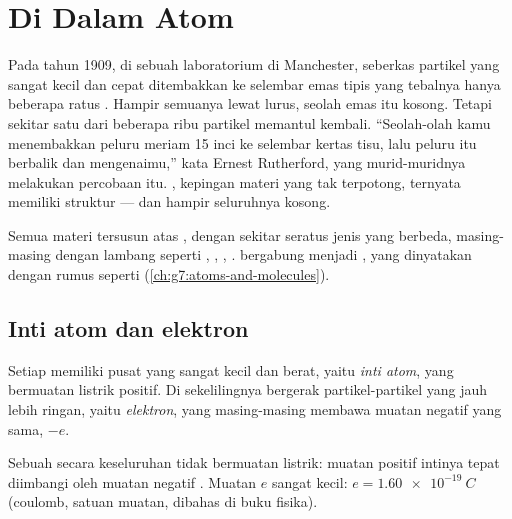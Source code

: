 \chapter{Di Dalam Atom}\label{ch:g9:inside-the-atom}

Pada tahun 1909, di sebuah laboratorium di Manchester, seberkas partikel
yang sangat kecil dan cepat ditembakkan ke selembar emas tipis yang
tebalnya hanya beberapa ratus . Hampir semuanya lewat lurus, seolah
emas itu kosong. Tetapi sekitar satu dari beberapa ribu partikel
memantul kembali. ``Seolah-olah kamu menembakkan peluru meriam 15 inci
ke selembar kertas tisu, lalu peluru itu berbalik dan mengenaimu,''
kata Ernest Rutherford, yang murid-muridnya melakukan percobaan itu.
, kepingan materi yang tak terpotong, ternyata memiliki struktur ---
dan hampir seluruhnya kosong.

\begin{recall}
Semua materi tersusun atas , dengan sekitar seratus jenis yang
berbeda, masing-masing dengan lambang seperti , , ,
.  bergabung menjadi , yang dinyatakan dengan
rumus seperti  (\cref{ch:g7:atoms-and-molecules}).
\end{recall}

\section{Inti atom dan elektron}

\begin{definition}\label{def:g9:inside-the-atom:nucleus}
Setiap  memiliki pusat yang sangat kecil dan berat, yaitu
\emph{inti atom}, yang bermuatan listrik positif. Di
sekelilingnya bergerak partikel-partikel yang jauh lebih ringan, yaitu
\emph{elektron}, yang masing-masing membawa muatan
negatif yang sama, $-e$.
\end{definition}

\begin{proposition}\label{prop:g9:inside-the-atom:neutral}
Sebuah  secara keseluruhan tidak bermuatan listrik: muatan positif
intinya tepat diimbangi oleh muatan negatif .
Muatan $e$ sangat kecil: $e = \qty{1.60e-19}{C}$ (coulomb, satuan
muatan, dibahas di buku fisika).
\end{proposition}

